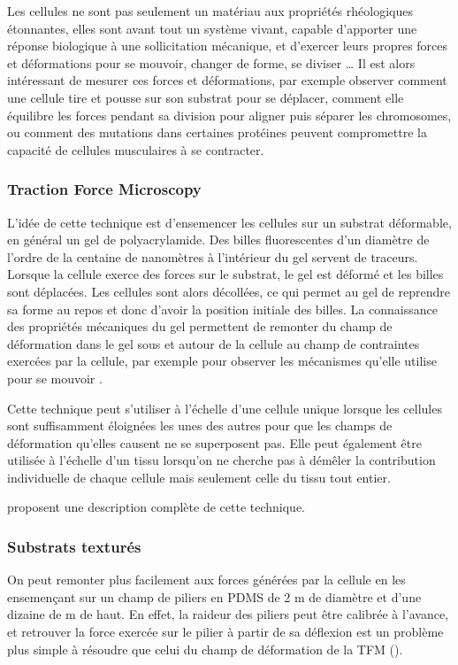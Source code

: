 Les cellules ne sont pas seulement un matériau aux propriétés rhéologiques étonnantes, elles sont avant tout un système vivant, capable d'apporter une réponse biologique à une sollicitation mécanique, et d'exercer leurs propres forces et déformations pour se mouvoir, changer de forme, se diviser \dots 
Il est alors intéressant de mesurer ces forces et déformations, par exemple observer comment une cellule tire et pousse sur son substrat pour se déplacer, comment elle équilibre les forces pendant sa division pour aligner puis séparer les chromosomes, ou comment des mutations dans certaines protéines peuvent compromettre la capacité de cellules musculaires à se contracter.

\subsubsection{Traction Force Microscopy}


L'idée de cette technique est d'ensemencer les cellules sur un substrat déformable, en général un gel de polyacrylamide. 
Des billes fluorescentes d'un diamètre de l'ordre de la centaine de nanomètres à l'intérieur du gel servent de traceurs. 
Lorsque la cellule exerce des forces sur le substrat, le gel est déformé et les billes sont déplacées. 
Les cellules sont alors décollées, ce qui permet au gel de reprendre sa forme au repos et donc d'avoir la position initiale des billes. 
La connaissance des propriétés mécaniques du gel permettent de remonter du champ de déformation dans le gel sous et autour de la cellule au champ de contraintes exercées par la cellule, par exemple pour observer les mécanismes qu'elle utilise pour se mouvoir \parencite{delanoe-ayari_4d_2010}.

Cette technique peut s'utiliser à l'échelle d'une cellule unique lorsque les cellules sont suffisamment éloignées les unes des autres pour que les champs de déformation qu'elles causent ne se superposent pas. 
Elle peut également être utilisée à l'échelle d'un tissu lorsqu'on ne cherche pas à démêler la contribution individuelle de chaque cellule mais seulement celle du tissu tout entier. 

\cite{martiel_measurement_2015} proposent une description complète de cette technique. 

\subsubsection{Substrats texturés}

On peut remonter plus facilement aux forces générées par la cellule en les ensemençant sur un champ de piliers en PDMS de 2 \micro m de diamètre et d'une dizaine de \micro m de haut. 
En effet, la raideur des piliers peut être calibrée à l'avance, et retrouver la force exercée sur le pilier à partir de sa déflexion est un problème plus simple à résoudre que celui du champ de déformation de la TFM (\cite{du_roure_force_2005}). 

